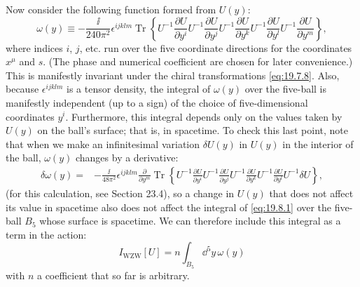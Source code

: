 Now consider the following function formed from $U(y)$:
\begin{equation}
\omega(y)\equiv
-\frac{\ii}{240\pi^2}\epsilon^{ijklm}
\operatorname{Tr}\left\{
U^{-1}\frac{\partial U}{\partial y^i}
U^{-1}\frac{\partial U}{\partial y^j}
U^{-1}\frac{\partial U}{\partial y^k}
U^{-1}\frac{\partial U}{\partial y^l}
U^{-1}\frac{\partial U}{\partial y^m}
\right\},
\tag{19.8.1}\label{eq:19.8.1}
\end{equation}
where indices $i$, $j$, etc. run over the five coordinate directions for the coordinates $x^\mu$ and $s$. (The phase and numerical coefficient are chosen for later convenience.) This is manifestly invariant under the chiral transformations \eqref{eq:19.7.8}. Also, because $\epsilon^{ijklm}$ is a tensor density, the integral of $\omega(y)$ over the five-ball is manifestly independent (up to a sign) of the choice of five-dimensional coordinates $y^i$. Furthermore, this integral depends only on the values taken by $U(y)$ on the ball's surface; that is, in spacetime. To check this last point, note that when we make an infinitesimal variation $\delta U(y)$ in $U(y)$ in the interior of the ball, $\omega(y)$ changes by a derivative:
\begin{align}
\delta\omega(y)
={}&-\frac{\ii}{48\pi^2}\epsilon^{ijklm}
\frac{\partial}{\partial y^m}
\operatorname{Tr}\left\{
U^{-1}\frac{\partial U}{\partial y^i}
U^{-1}\frac{\partial U}{\partial y^j}
U^{-1}\frac{\partial U}{\partial y^k}
U^{-1}\frac{\partial U}{\partial y^l}
U^{-1}\delta U
\right\},
\tag{19.8.2}\label{eq:19.8.2}
\end{align}
(for this calculation, see Section 23.4), so a change in $U(y)$ that does not affect its value in spacetime also does not affect the integral of \eqref{eq:19.8.1} over the five-ball $B_5$ whose surface is spacetime. We can therefore include this integral as a term in the action:
\begin{equation}
I_{\mathrm{WZW}}[U]
=n\int_{B_5}\dd^5y\,\omega(y)
\tag{19.8.3}\label{eq:19.8.3}
\end{equation}
with $n$ a coefficient that so far is arbitrary.

